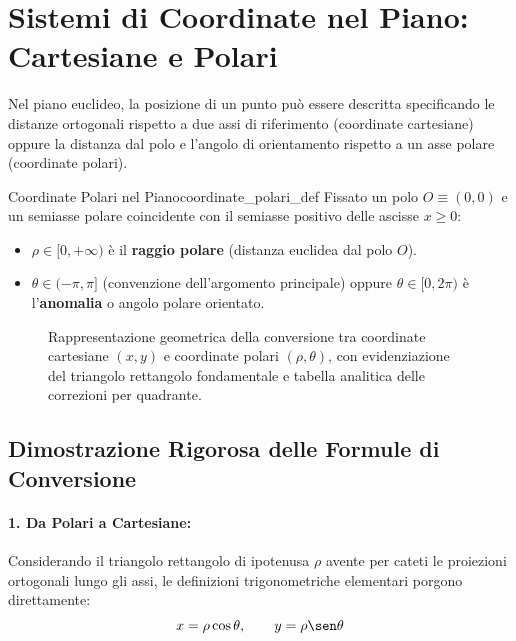 \section{Sistemi di Coordinate nel Piano: Cartesiane e Polari}
\label{sec:coordinate_polari_teoria}

Nel piano euclideo, la posizione di un punto può essere descritta specificando le distanze ortogonali rispetto a due assi di riferimento (coordinate cartesiane) oppure la distanza dal polo e l'angolo di orientamento rispetto a un asse polare (coordinate polari).

\begin{definizione}{Coordinate Polari nel Piano}{coordinate_polari_def}
Fissato un polo $O \equiv (0, 0)$ e un semiasse polare coincidente con il semiasse positivo delle ascisse $x \ge 0$:
\begin{itemize}
    \item $\rho \in [0, +\infty)$ è il \textbf{raggio polare} (distanza euclidea dal polo $O$).
    \item $\theta \in (-\pi, \pi]$ (convenzione dell'argomento principale) oppure $\theta \in [0, 2\pi)$ è l'\textbf{anomalia} o angolo polare orientato.
\end{itemize}
\end{definizione}

\begin{figure}[htbp]
    \centering
    
    \caption{Rappresentazione geometrica della conversione tra coordinate cartesiane $(x,y)$ e coordinate polari $(\rho, \theta)$, con evidenziazione del triangolo rettangolo fondamentale e tabella analitica delle correzioni per quadrante.}
    \label{fig:coord_polari_schema}
\end{figure}

\subsection{Dimostrazione Rigorosa delle Formule di Conversione}
\paragraph{1. Da Polari a Cartesiane:}
Considerando il triangolo rettangolo di ipotenusa $\rho$ avente per cateti le proiezioni ortogonali lungo gli assi, le definizioni trigonometriche elementari porgono direttamente:
\[
    x = \rho \cos \theta, \qquad y = \rho \sen \theta
\]

